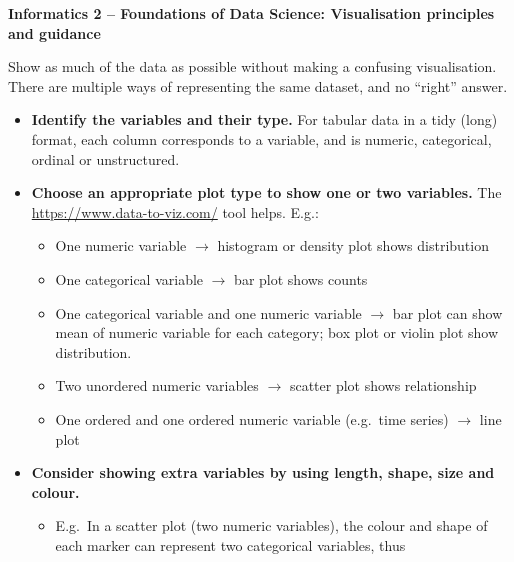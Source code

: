 \documentclass[10pt]{article}
\newlength{\calloutparindent}
\newenvironment{callout}[2][standard]{
  \setlength{\calloutparindent}{\parindent}
  \begin{tcolorbox}[enhanced jigsaw,
    leftrule=.15mm, toprule=.15mm,
    colframe=quarto-callout-#1-color-frame, opacityback=0,
    colback=white, coltitle=black, rightrule=.15mm, breakable,
    colbacktitle=quarto-callout-#1-color!10!white,
    opacitybacktitle=0.6, titlerule=0mm, left=1mm,right=1mm,
    title=\textcolor{quarto-callout-#1-color}{\expandafter\csname
      quartocallout#1icon\endcsname}{\textbf{#2}},
    bottomrule=.15mm, toptitle=1mm, arc=.35mm, bottomtitle=1mm,
    before=\par\medskip]%
    \setlength{\parindent}{\calloutparindent}\noindent\ignorespaces}%
  {\end{tcolorbox}}
\newcommand{\principle}[2]{\begin{callout}{#1}\raggedright#2\end{callout}
}
\begin{document}
\raggedright
\pagestyle{empty}

\begin{center}
  \large\textbf{Informatics 2 -- Foundations of Data Science: Visualisation
    principles and guidance}
\end{center}


\setlength{\columnseprule}{.2pt}
\begin{multicols}{3}
  \principle{Principle 1: Show the data}%
  {Show as much of the data as possible without making a confusing
    visualisation. There are multiple ways of representing the same
    dataset, and no ``right'' answer.}
\begin{itemize}
\item \textbf{Identify the variables and their type.} For tabular data
  in a tidy (long) format, each column corresponds to a variable, and
  is numeric, categorical, ordinal or unstructured.
\item
  \textbf{Choose an appropriate plot type to show one or two
    variables.}
  The \url{https://www.data-to-viz.com/} tool helps. E.g.:
  \begin{itemize}
  \item One numeric variable $\rightarrow$ histogram or density plot
    shows distribution
  \item One categorical variable $\rightarrow$ bar plot
    shows counts
  \item One categorical variable and one numeric variable
    $\rightarrow$ bar plot can show mean of numeric variable for each
    category; box plot or violin plot show distribution.
  \item Two unordered numeric variables $\rightarrow$ scatter plot
    shows relationship
  \item One ordered and one ordered numeric variable (e.g.~time series)
    $\rightarrow$ line plot
  \end{itemize}
\item
  \textbf{Consider showing extra variables by using length, shape,
    size and colour.}
  \begin{itemize}
  \item E.g.~In a scatter plot (two numeric variables), the colour and
    shape of each marker can represent two categorical variables, thus

\end{itemize}
\end{itemize}
\end{multicols}
\end{document}
